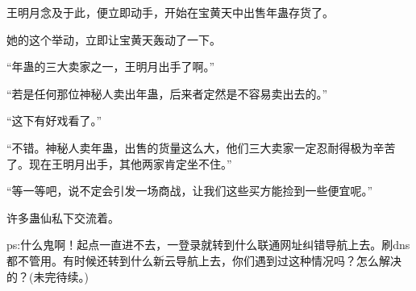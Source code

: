 \begin{this_body}
王明月念及于此，便立即动手，开始在宝黄天中出售年蛊存货了。

她的这个举动，立即让宝黄天轰动了一下。

“年蛊的三大卖家之一，王明月出手了啊。”

“若是任何那位神秘人卖出年蛊，后来者定然是不容易卖出去的。”

“这下有好戏看了。”

“不错。神秘人卖年蛊，出售的货量这么大，他们三大卖家一定忍耐得极为辛苦了。现在王明月出手，其他两家肯定坐不住。”

“等一等吧，说不定会引发一场商战，让我们这些买方能捡到一些便宜呢。”

许多蛊仙私下交流着。

ps:什么鬼啊！起点一直进不去，一登录就转到什么联通网址纠错导航上去。刷dns都不管用。有时候还转到什么新云导航上去，你们遇到过这种情况吗？怎么解决的？(未完待续。)

\end{this_body}

